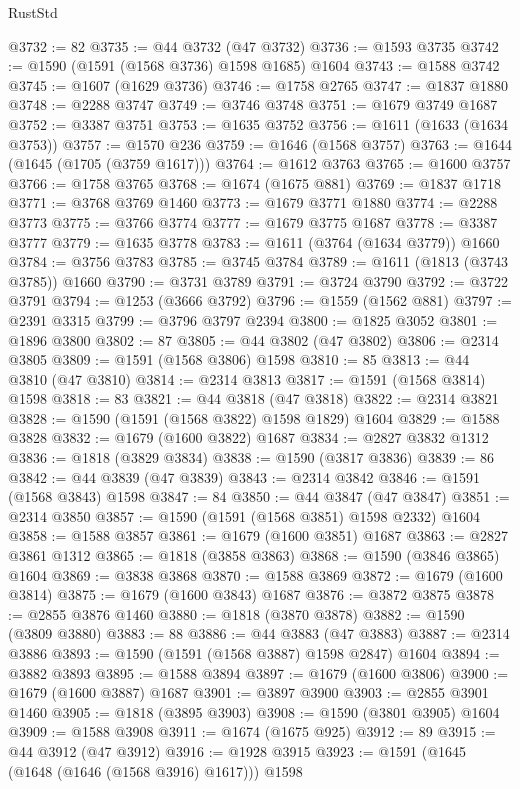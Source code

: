\begin{lexlean}{RustStd}
\begin{coremodule}
@3732 := 82
@3735 := @44 @3732 (@47 @3732)
@3736 := @1593 @3735
@3742 := @1590 (@1591 (@1568 @3736) @1598 @1685) @1604
@3743 := @1588 @3742
@3745 := @1607 (@1629 @3736)
@3746 := @1758 @2765
@3747 := @1837 @1880
@3748 := @2288 @3747
@3749 := @3746 @3748
@3751 := @1679 @3749 @1687
@3752 := @3387 @3751
@3753 := @1635 @3752
@3756 := @1611 (@1633 (@1634 @3753))
@3757 := @1570 @236
@3759 := @1646 (@1568 @3757)
@3763 := @1644 (@1645 (@1705 (@3759 @1617)))
@3764 := @1612 @3763
@3765 := @1600 @3757
@3766 := @1758 @3765
@3768 := @1674 (@1675 @881)
@3769 := @1837 @1718
@3771 := @3768 @3769 @1460
@3773 := @1679 @3771 @1880
@3774 := @2288 @3773
@3775 := @3766 @3774
@3777 := @1679 @3775 @1687
@3778 := @3387 @3777
@3779 := @1635 @3778
@3783 := @1611 (@3764 (@1634 @3779)) @1660
@3784 := @3756 @3783
@3785 := @3745 @3784
@3789 := @1611 (@1813 (@3743 @3785)) @1660
@3790 := @3731 @3789
@3791 := @3724 @3790
@3792 := @3722 @3791
@3794 := @1253 (@3666 @3792)
@3796 := @1559 (@1562 @881)
@3797 := @2391 @3315
@3799 := @3796 @3797 @2394
@3800 := @1825 @3052
@3801 := @1896 @3800
@3802 := 87
@3805 := @44 @3802 (@47 @3802)
@3806 := @2314 @3805
@3809 := @1591 (@1568 @3806) @1598
@3810 := 85
@3813 := @44 @3810 (@47 @3810)
@3814 := @2314 @3813
@3817 := @1591 (@1568 @3814) @1598
@3818 := 83
@3821 := @44 @3818 (@47 @3818)
@3822 := @2314 @3821
@3828 := @1590 (@1591 (@1568 @3822) @1598 @1829) @1604
@3829 := @1588 @3828
@3832 := @1679 (@1600 @3822) @1687
@3834 := @2827 @3832 @1312
@3836 := @1818 (@3829 @3834)
@3838 := @1590 (@3817 @3836)
@3839 := 86
@3842 := @44 @3839 (@47 @3839)
@3843 := @2314 @3842
@3846 := @1591 (@1568 @3843) @1598
@3847 := 84
@3850 := @44 @3847 (@47 @3847)
@3851 := @2314 @3850
@3857 := @1590 (@1591 (@1568 @3851) @1598 @2332) @1604
@3858 := @1588 @3857
@3861 := @1679 (@1600 @3851) @1687
@3863 := @2827 @3861 @1312
@3865 := @1818 (@3858 @3863)
@3868 := @1590 (@3846 @3865) @1604
@3869 := @3838 @3868
@3870 := @1588 @3869
@3872 := @1679 (@1600 @3814)
@3875 := @1679 (@1600 @3843) @1687
@3876 := @3872 @3875
@3878 := @2855 @3876 @1460
@3880 := @1818 (@3870 @3878)
@3882 := @1590 (@3809 @3880)
@3883 := 88
@3886 := @44 @3883 (@47 @3883)
@3887 := @2314 @3886
@3893 := @1590 (@1591 (@1568 @3887) @1598 @2847) @1604
@3894 := @3882 @3893
@3895 := @1588 @3894
@3897 := @1679 (@1600 @3806)
@3900 := @1679 (@1600 @3887) @1687
@3901 := @3897 @3900
@3903 := @2855 @3901 @1460
@3905 := @1818 (@3895 @3903)
@3908 := @1590 (@3801 @3905) @1604
@3909 := @1588 @3908
@3911 := @1674 (@1675 @925)
@3912 := 89
@3915 := @44 @3912 (@47 @3912)
@3916 := @1928 @3915
@3923 := @1591 (@1645 (@1648 (@1646 (@1568 @3916) @1617))) @1598

\end{coremodule}
\end{lexlean}
